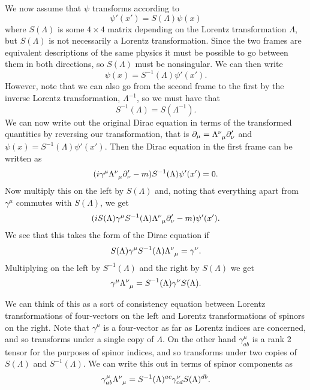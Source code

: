 \documentclass[fleqn]{NotesClass}
\begin{document}
    We now assume that \(\psi\) transforms according to
    \begin{equation}
        \psi'(x') = S(\Lambda)\psi(x)
    \end{equation}
    where \(S(\Lambda)\) is some \(4 \times 4\) matrix depending on the Lorentz transformation \(\Lambda\), but \(S(\Lambda)\) is not necessarily a Lorentz transformation.
    Since the two frames are equivalent descriptions of the same physics it must be possible to go between them in both directions, so \(S(\Lambda)\) must be nonsingular.
    We can then write
    \begin{equation}
        \psi(x) = S^{-1}(\Lambda)\psi'(x').
    \end{equation}
    However, note that we can also go from the second frame to the first by the inverse Lorentz transformation, \(\Lambda^{-1}\), so we must have that
    \begin{equation}
        S^{-1}(\Lambda) = S(\Lambda^{-1}).
    \end{equation}
    We can now write out the original Dirac equation in terms of the transformed quantities by reversing our transformation, that is \(\partial_\mu = \tensor{\Lambda}{^\nu_\mu}\partial'_\nu\) and \(\psi(x) = S^{-1}(\Lambda)\psi'(x')\).
    Then the Dirac equation in the first frame can be written as
    \begin{equation}
        (i\gamma^\mu \tensor{\Lambda}{^\nu_\mu}\partial'_\nu - m)S^{-1}(\Lambda)\psi'(x') = 0.
    \end{equation}
    Now multiply this on the left by \(S(\Lambda)\) and, noting that everything apart from \(\gamma^\mu\) commutes with \(S(\Lambda)\), we get
    \begin{equation}
        (iS(\Lambda)\gamma^\mu S^{-1}(\Lambda) \tensor{\Lambda}{^\nu_\mu}\partial'_\nu - m)\psi'(x').
    \end{equation}
    We see that this takes the form of the Dirac equation if
    \begin{equation}
        S(\Lambda)\gamma^\mu S^{-1}(\Lambda)\tensor{\Lambda}{^\nu_\mu} = \gamma^\nu.
    \end{equation}
    Multiplying on the left by \(S^{-1}(\Lambda)\) and the right by \(S(\Lambda)\) we get
    \begin{equation}
        \gamma^\mu \tensor{\Lambda}{^\nu_\mu} = S^{-1}(\Lambda)\gamma^\nu S(\Lambda).
    \end{equation}
    
    We can think of this as a sort of consistency equation between Lorentz transformations of four-vectors on the left and Lorentz transformations of spinors on the right.
    Note that \(\gamma^\mu\) is a four-vector as far as Lorentz indices are concerned, and so transforms under a single copy of \(\Lambda\).
    On the other hand \(\gamma^\mu_{ab}\) is a rank 2 tensor for the purposes of spinor indices, and so transforms under two copies of \(S(\Lambda)\) and \(S^{-1}(\Lambda)\).
    We can write this out in terms of spinor components as
    \begin{equation}
        \gamma^\mu_{ab} \tensor{\Lambda}{^\nu_\mu} = S^{-1}(\Lambda)^{ac} \gamma^\nu_{cd} S(\Lambda)^{db}.
    \end{equation}
    
\end{document}
